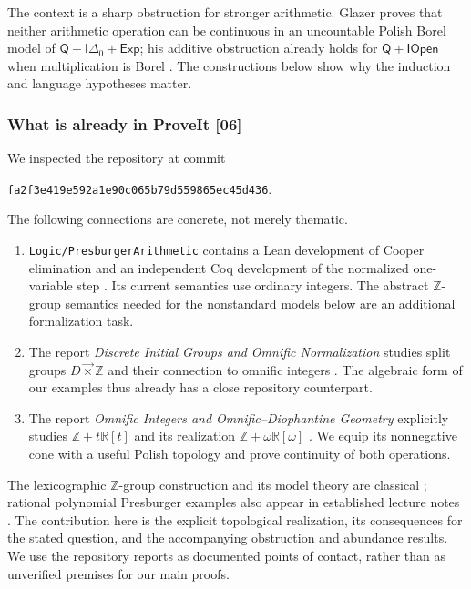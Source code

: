 \documentclass[11pt]{article}
\numberwithin{equation}{section}
\theoremstyle{definition}
\theoremstyle{remark}
\newcommand{\Z}{\mathbb Z}
\newcommand{\R}{\mathbb R}
\newcommand{\lex}{\mathbin{\overrightarrow\times}}
\newcommand{\IOpen}{\mathsf{IOpen}}
\newcommand{\src}[1]{\textup{\textsf{\small[#1]}}}
\begin{document}
The context is a sharp obstruction for stronger arithmetic. Glazer proves
that neither arithmetic operation can be continuous in an uncountable
Polish Borel model of
$\mathsf Q+\mathsf I\Delta_0+\mathsf{Exp}$; his additive obstruction already
holds for $\mathsf Q+\IOpen$ when multiplication is Borel
\cite[Theorem~2 and Corollary~1]{Glazer}. The constructions below show why
the induction and language hypotheses matter.

\subsubsection{What is already in ProveIt \src{06}}

We inspected the repository at commit
\begin{center}
\texttt{fa2f3e419e592a1e90c065b79d559865ec45d436}.
\end{center}
The following connections are concrete, not merely thematic.

\begin{enumerate}
\item \texttt{Logic/PresburgerArithmetic} contains a Lean development of
Cooper elimination and an independent Coq development of the normalized
one-variable step \cite{s06:RepoPresburger}. Its current semantics use
ordinary integers. The abstract $\Z$-group semantics needed for the
nonstandard models below are an additional formalization task.
\item The report \emph{Discrete Initial Groups and Omnific Normalization}
studies split groups $D\lex\Z$ and their connection to omnific integers
\cite{s06:RepoGroups}. The algebraic form of our examples thus already has a
close repository counterpart.
\item The report \emph{Omnific Integers and Omnific--Diophantine Geometry}
explicitly studies $\Z+t\R[t]$ and its realization
$\Z+\omega\R[\omega]$ \cite{s06:RepoPolynomial}. We equip its nonnegative
cone with a useful Polish topology and prove continuity of both
operations.
\end{enumerate}

The lexicographic $\Z$-group construction and its model theory are
classical \cite{jerabek}; rational polynomial Presburger examples also
appear in established lecture notes \cite{CookPitassi}. The contribution
here is the explicit topological realization, its consequences for the
stated question, and the accompanying obstruction and abundance results.
We use the repository reports as documented points of contact, rather
than as unverified premises for our main proofs.
\end{document}
